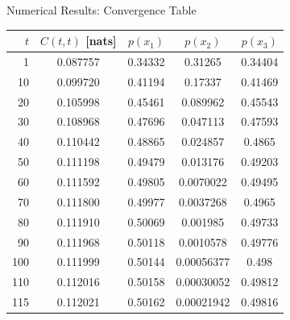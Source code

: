 \documentclass{beamer}
\begin{document}
\begin{frame}{Numerical Results: Convergence Table}
    \begin{table}
        \centering
        \footnotesize
        \begin{tabular}{rcccc}
            \toprule
            $t$  & $C(t, t)$ [nats] & $p(x_1)$ & $p(x_2)$ & $p(x_3)$ \\
            \midrule
            1    & 0.087757 & 0.34332 & 0.31265     & 0.34404 \\
            10   & 0.099720 & 0.41194 & 0.17337     & 0.41469 \\
            20   & 0.105998 & 0.45461 & 0.089962    & 0.45543 \\
            30   & 0.108968 & 0.47696 & 0.047113    & 0.47593 \\
            40   & 0.110442 & 0.48865 & 0.024857    & 0.4865  \\
            50   & 0.111198 & 0.49479 & 0.013176    & 0.49203 \\
            60   & 0.111592 & 0.49805 & 0.0070022   & 0.49495 \\
            70   & 0.111800 & 0.49977 & 0.0037268   & 0.4965  \\
            80   & 0.111910 & 0.50069 & 0.001985    & 0.49733 \\
            90   & 0.111968 & 0.50118 & 0.0010578   & 0.49776 \\
            100  & 0.111999 & 0.50144 & 0.00056377  & 0.498   \\
            110  & 0.112016 & 0.50158 & 0.00030052  & 0.49812 \\
            115  & 0.112021 & 0.50162 & 0.00021942  & 0.49816 \\
            \bottomrule
        \end{tabular}
    \end{table}
\end{frame}
\end{document}
